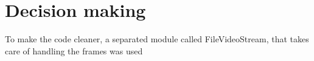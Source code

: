 
\chapter{Decision making}

To make the code cleaner, a separated module called FileVideoStream, that takes care of handling the frames was used
